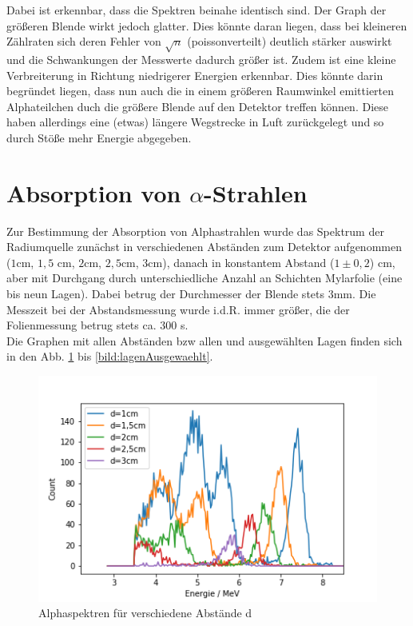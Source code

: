 Dabei ist erkennbar, dass die Spektren beinahe identisch sind. Der Graph der größeren Blende wirkt jedoch glatter. Dies könnte 
daran liegen, dass bei kleineren Zählraten sich deren Fehler von $\sqrt{n}$ (poissonverteilt) deutlich stärker auswirkt und die Schwankungen der 
Messwerte dadurch größer ist. Zudem ist eine kleine Verbreiterung in Richtung niedrigerer Energien erkennbar. Dies könnte darin begründet 
liegen, dass nun auch die in einem größeren Raumwinkel emittierten Alphateilchen duch die größere Blende auf den Detektor treffen können. 
Diese haben allerdings eine (etwas) längere Wegstrecke in Luft zurückgelegt und so durch Stöße mehr Energie abgegeben.





\section{Absorption von $\alpha$-Strahlen}
\label{subs:abs}

Zur Bestimmung der Absorption von Alphastrahlen wurde das Spektrum der Radiumquelle zunächst in verschiedenen Abständen zum Detektor 
aufgenommen ($1$cm, $1,5$ cm, $2$cm, $2,5$cm, $3$cm), danach in konstantem Abstand ($1 \pm 0,2$) cm, aber mit Durchgang durch 
unterschiedliche Anzahl an Schichten Mylarfolie (eine bis neun Lagen). 
Dabei betrug der Durchmesser der Blende stets $3$mm. Die Messzeit bei der Abstandsmessung wurde i.d.R. immer größer, die der 
Folienmessung betrug stets ca. $300$ s.\\

Die Graphen mit allen Abständen bzw allen und ausgewählten Lagen finden sich in den Abb. \ref{bild:abstandAlle} bis \ref{bild:lagenAusgewaehlt}. \\

\begin{figure}[h]
    \centering
    \includegraphics[scale=0.75]{Bilder/abstandAlle.png}
    \caption{Alphaspektren für verschiedene Abstände d}
    \label{bild:abstandAlle}
\end{figure}

